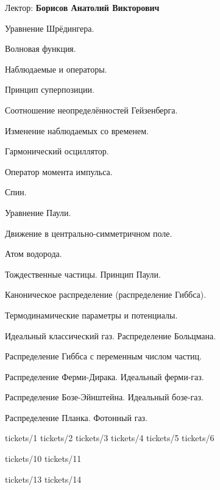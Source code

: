 \documentclass[specialist, subf, href, colorlinks=true, 12pt, times, mtpro, final]{disser}
\begin{document}
\tableofcontents

\newpage
{}
\noindent Лектор: {\bf Борисов Анатолий Викторович}\\

\begin{enumerate}
{\footnotesize
\item Уравнение Шрёдингера.
\item Волновая функция.
\item Наблюдаемые и операторы.
\item Принцип суперпозиции.
\item Соотношение неопределённостей Гейзенберга.
\item Изменение наблюдаемых со временем.
\item Гармонический осциллятор.
\item Оператор момента импульса.
\item Спин.
\item Уравнение Паули.
\item Движение в центрально-симметричном поле.
\item Атом водорода.
\item Тождественные частицы. Принцип Паули.
\item Каноническое распределение (распределение Гиббса).
\item Термодинамические параметры и потенциалы.
\item Идеальный классический газ. Распределение Больцмана. 
\item Распределение Гиббса с переменным числом частиц. 
\item Распределение Ферми-Дирака. Идеальный ферми-газ.
\item Распределение Бозе-Эйнштейна. Идеальный бозе-газ.
\item Распределение Планка. Фотонный газ.
}
\end{enumerate}

 {tickets/1}
 {tickets/2}
 {tickets/3}
 {tickets/4}
 {tickets/5}
 {tickets/6}

 {tickets/10}
 {tickets/11}

 {tickets/13}
 {tickets/14}
 
\end{document}
